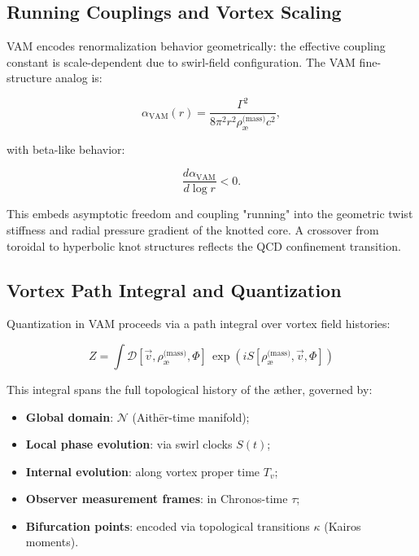 \subsection{Running Couplings and Vortex Scaling}

VAM encodes renormalization behavior geometrically: the effective coupling constant is scale-dependent due to swirl-field configuration. The VAM fine-structure analog is:

\begin{equation}
\alpha_{\text{VAM}}(r) = \frac{\Gamma^2}{8\pi^2 r^2 \rho_{\text{\ae}}^{\text{(mass)}} c^2},
\end{equation}

with beta-like behavior:

\begin{equation}
\frac{d \alpha_{\text{VAM}}}{d \log r} < 0.
\end{equation}

This embeds asymptotic freedom and coupling "running" into the geometric twist stiffness and radial pressure gradient of the knotted core. A crossover from toroidal to hyperbolic knot structures reflects the QCD confinement transition.

\subsection{Vortex Path Integral and Quantization}

Quantization in VAM proceeds via a path integral over vortex field histories:

\begin{equation}
Z = \int \mathcal{D}[\vec{v}, \rho_{\text{\ae}}^{\text{(mass)}}, \Phi] \, \exp\left( i S[\rho_{\text{\ae}}^{\text{(mass)}}, \vec{v}, \Phi] \right)
\end{equation}

This integral spans the full topological history of the æther, governed by:

\begin{itemize}
    \item \textbf{Global domain}: \( \mathcal{N} \) (Aithēr-time manifold);
    \item \textbf{Local phase evolution}: via swirl clocks \( S(t) \);
    \item \textbf{Internal evolution}: along vortex proper time \( T_v \);
    \item \textbf{Observer measurement frames}: in Chronos-time \( \tau \);
    \item \textbf{Bifurcation points}: encoded via topological transitions \( \kappa \) (Kairos moments).
\end{itemize}

